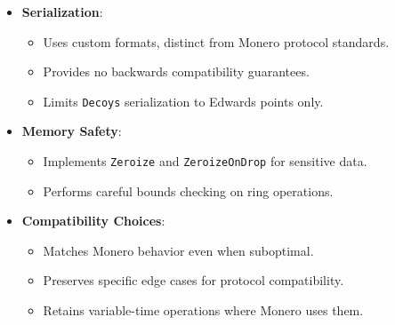 \begin{itemize}
  \item \textbf{Serialization}:
    \begin{itemize}
      \item Uses custom formats, distinct from Monero protocol standards.  %
      \item Provides no backwards compatibility guarantees.  %
      \item Limits \texttt{Decoys} serialization to Edwards points only.  %
    \end{itemize}
  \item \textbf{Memory Safety}:
    \begin{itemize}
      \item Implements \texttt{Zeroize} and \texttt{ZeroizeOnDrop} for sensitive data.  %
      \item Performs careful bounds checking on ring operations. %
    \end{itemize}
  \item \textbf{Compatibility Choices}:
    \begin{itemize}
      \item Matches Monero behavior even when suboptimal.  %
      \item Preserves specific edge cases for protocol compatibility.  %
      \item Retains variable-time operations where Monero uses them. %
    \end{itemize}
\end{itemize}

